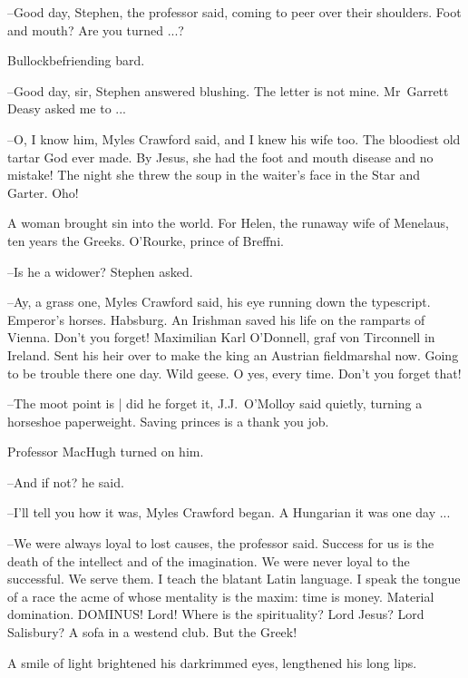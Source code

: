 --Good day, Stephen,
the professor said,
coming to peer over their shoulders.
Foot and mouth?
Are you turned ...?

Bullockbefriending bard.



--Good day, sir,
Stephen answered blushing.
The letter is not mine.
Mr~Garrett Deasy asked me to ...

--O, I know him,
Myles Crawford said,
and I knew his wife too.
The bloodiest old tartar God ever made.
By Jesus,
she had the foot and mouth disease
and no mistake!
The night she threw the soup in the waiter's face in the Star and Garter.
Oho!

A woman brought sin into the world.
For Helen,
the runaway wife of Menelaus,
ten years the Greeks.
O'Rourke,
prince of Breffni.

--Is he a widower?
Stephen asked.

--Ay, a grass one,
Myles Crawford said,
his eye running down the typescript.
Emperor's horses.
Habsburg.
An Irishman saved his life on the ramparts of Vienna.
Don't you forget!
Maximilian Karl O'Donnell,
graf von Tirconnell in Ireland.
Sent his heir over to make the king an Austrian fieldmarshal now.
Going to be trouble there one day.
Wild geese.
O yes, every time.
Don't you forget that!

--The moot point is |
did he forget it,
J.J.~O'Molloy said quietly,
turning a horseshoe paperweight.
Saving princes is a thank you job.

Professor MacHugh turned on him.

--And if not?
he said.

--I'll tell you how it was,
Myles Crawford began.
A Hungarian it was one day ...



--We were always loyal to lost causes,
the professor said.
Success for us is the death of the intellect and of the imagination.
We were never loyal to the successful.
We serve them.
I teach the blatant Latin language.
I speak the tongue of a race the acme of whose mentality is the maxim:
time is money.
Material domination.
DOMINUS!
Lord!
Where is the spirituality?
Lord Jesus?
Lord Salisbury?
A sofa in a westend club.
But the Greek!



A smile of light brightened his darkrimmed eyes,
lengthened his long lips.

